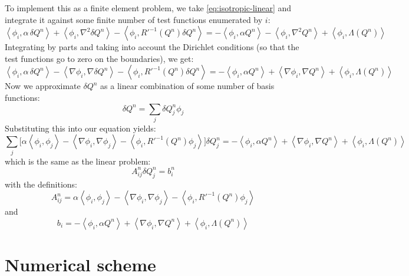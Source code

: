 \documentclass[reqno]{article}
\begin{document}
	To implement this as a finite element problem, we take \eqref{eq:isotropic-linear} and integrate it against some finite number of test functions enumerated by $i$:
	\begin{equation}
		\left< \phi_i, \alpha \, \delta Q^n \right>
		+ \left< \phi_i, \nabla^2 \delta Q^n \right>
		- \left< \phi_i, R'^{-1}(Q^n) \delta Q^n \right>
		=
		- \left< \phi_i, \alpha Q^n \right>
		- \left< \phi_i, \nabla^2 Q^n \right>
		+ \left< \phi_i, \Lambda(Q^n) \right>
	\end{equation}
	Integrating by parts and taking into account the Dirichlet conditions (so that the test functions go to zero on the boundaries), we get:
	\begin{equation}
		\left< \phi_i, \alpha \, \delta Q^n \right>
		- \left< \nabla \phi_i, \nabla \delta Q^n \right>
		- \left< \phi_i, R'^{-1}(Q^n) \delta Q^n \right>
		=
		- \left< \phi_i, \alpha Q^n \right>
		+ \left< \nabla \phi_i, \nabla Q^n \right>
		+ \left< \phi_i, \Lambda(Q^n) \right>
	\end{equation}
	Now we approximate $\delta Q^n$ as a linear combination of some number of basis functions:
	\begin{equation}
		\delta Q^n = \sum_j \delta Q^n_j \phi_j
	\end{equation}
	Substituting this into our equation yields:
	\begin{equation}
		\sum_j \biggl[
		\alpha \left< \phi_i, \phi_j \right>
		- \left< \nabla \phi_i, \nabla \phi_j \right>
		- \left< \phi_i, R'^{-1}(Q^n) \phi_j \right>
		\biggr] \delta Q^n_j
		=
		- \left< \phi_i, \alpha Q^n \right>
		+ \left< \nabla \phi_i, \nabla Q^n \right>
		+ \left< \phi_i, \Lambda(Q^n) \right>
	\end{equation}
	which is the same as the linear problem:
	\begin{equation}
		A^n_{ij} \delta Q^n_j = b^n_i
	\end{equation}
	with the definitions:
	\begin{equation}
		A^n_{ij} = 
		\alpha \left< \phi_i, \phi_j \right>
		- \left< \nabla \phi_i, \nabla \phi_j \right>
		- \left< \phi_i, R'^{-1}(Q^n) \phi_j \right>
	\end{equation}
	and
	\begin{equation}
		b_i =
		- \left< \phi_i, \alpha Q^n \right>
		+ \left< \nabla \phi_i, \nabla Q^n \right>
		+ \left< \phi_i, \Lambda(Q^n) \right>
	\end{equation}
	
	\section{Numerical scheme}
\end{document}
